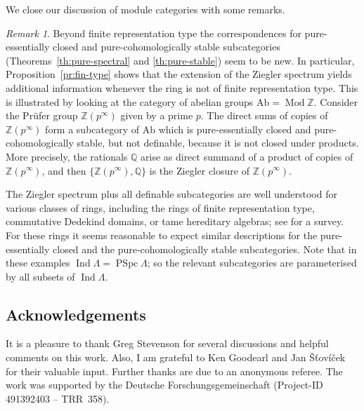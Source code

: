 \documentclass[a4paper]{amsart}
\theoremstyle{plain}
\theoremstyle{definition}
\theoremstyle{remark}
\newtheorem{rem}[thm]{Remark}
\numberwithin{equation}{section}
\newcommand{\Ind}{\operatorname{Ind}}
\newcommand{\Mod}{\operatorname{Mod}}
\newcommand{\PSpc}{\operatorname{PSpc}}
\newcommand{\Ab}{\mathrm{Ab}}
\def\bbQ{\mathbb Q}
\def\bbZ{\mathbb Z}
\def\La{\Lambda}
\begin{document}
We close our discussion of module categories with some remarks.

\begin{rem}
  Beyond finite representation type the correspondences for
  pure-essentially closed and pure-cohomologically stable subcategories
  (Theorems~\ref{th:pure-spectral} and \ref{th:pure-stable}) seem to
  be new. In particular, Proposition~\ref{pr:fin-type} shows that the
  extension of the Ziegler spectrum yields additional information
  whenever the ring is not of finite representation type. This is
  illustrated by looking at the category of abelian groups
  $\Ab=\Mod\bbZ$. Consider the Pr\"ufer group $\bbZ(p^\infty)$ given
  by a prime $p$. The direct sums of copies of $\bbZ(p^\infty)$ form a
  subcategory of $\Ab$ which is pure-essentially closed and pure-cohomologically stable, but not
  definable, because it is not closed under products. More precisely,
  the rationals $\bbQ$ arise as direct summand of a product of copies
  of $\bbZ(p^\infty)$, and then $\{\bbZ(p^\infty),\bbQ\}$ is the
  Ziegler closure of $\bbZ(p^\infty)$.

  The Ziegler spectrum plus all definable subcategories are well
  understood for various classes of rings, including the rings of
  finite representation type, commutative Dedekind domains, or tame
  hereditary algebras; see \cite{Pr2009} for a survey. For these rings
  it seems reasonable to expect similar descriptions for the
  pure-essentially closed and the pure-cohomologically stable
  subcategories. Note that in these examples $\Ind\La=\PSpc\La$; so
  the relevant subcategories are parameterised by all subsets of
  $\Ind\La$.
\end{rem}
  
\subsection*{Acknowledgements} 
It is a pleasure to thank Greg Stevenson for several discussions and
helpful comments on this work. Also, I am grateful to Ken Goodearl and
Jan Šťovíček for their valuable input. Further thanks are due to
an anonymous referee. The work was supported by the Deutsche
Forschungsgemeinschaft (Project-ID 491392403 – TRR~358).
\end{document}
